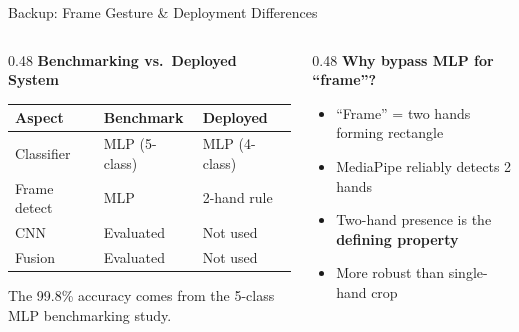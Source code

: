 \documentclass[aspectratio=169]{beamer}
\begin{document}
\begin{frame}[noframenumbering]{Backup: Frame Gesture \& Deployment Differences}
\begin{columns}[T]
\begin{column}{0.48\textwidth}
    \textbf{Benchmarking vs.\ Deployed System}

    \vspace{0.5em}
    \begin{tabular}{lll}
    \toprule
    \textbf{Aspect} & \textbf{Benchmark} & \textbf{Deployed} \\
    \midrule
    Classifier & MLP (5-class) & MLP (4-class) \\
    Frame detect & MLP & 2-hand rule \\
    CNN & Evaluated & Not used \\
    Fusion & Evaluated & Not used \\
    \bottomrule
    \end{tabular}

    \vspace{0.8em}
    {\small The 99.8\% accuracy comes from the 5-class MLP benchmarking study.}
\end{column}
\begin{column}{0.48\textwidth}
    \textbf{Why bypass MLP for ``frame''?}

    \vspace{0.5em}
    \begin{itemize}
        \setlength\itemsep{0.5em}
        \item ``Frame'' = two hands forming rectangle
        \item MediaPipe reliably detects 2 hands
        \item Two-hand presence is the \textbf{defining property}
        \item More robust than single-hand crop
    \end{itemize}
\end{column}
\end{columns}
\end{frame}
\end{document}
